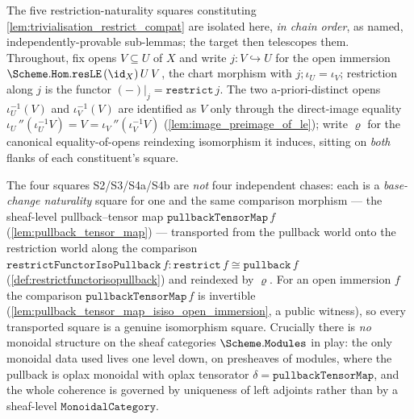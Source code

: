 The five restriction-naturality squares constituting \cref{lem:trivialisation_restrict_compat}
are isolated here, \emph{in chain order}, as named, independently-provable sub-lemmas; the target
then telescopes them. Throughout, fix opens \(V \subseteq U\) of \(X\) and write
\(j : V \hookrightarrow U\) for the open immersion \(\Scheme.\mathtt{Hom.resLE}\,(\id_X)\,U\,V\),
the chart morphism with \(j \mathbin{;} \iota_U = \iota_V\); restriction along \(j\) is the
functor \((-)|_j = \mathtt{restrict}\,j\). The two a-priori-distinct opens
\(\iota_U^{-1}(V)\) and \(\iota_V^{-1}(V)\) are identified as \(V\) only through the
direct-image equality \(\iota_U\,''(\iota_U^{-1}V) = V = \iota_V\,''(\iota_V^{-1}V)\)
(\cref{lem:image_preimage_of_le}); write \(\varrho\) for the canonical equality-of-opens
reindexing isomorphism it induces, sitting on \emph{both} flanks of each constituent's square.

The four squares S2/S3/S4a/S4b are \emph{not} four independent chases: each is a
\emph{base-change naturality} square for one and the same comparison morphism --- the
sheaf-level pullback--tensor map \(\mathtt{pullbackTensorMap}\,f\)
(\cref{lem:pullback_tensor_map}) --- transported from the pullback world onto the
restriction world along the comparison \(\mathtt{restrictFunctorIsoPullback}\,f :
\mathtt{restrict}\,f \cong \mathtt{pullback}\,f\) (\cref{def:restrictfunctorisopullback})
and reindexed by \(\varrho\). For an open immersion \(f\) the comparison
\(\mathtt{pullbackTensorMap}\,f\) is invertible
(\cref{lem:pullback_tensor_map_isiso_open_immersion}, a public witness), so every
transported square is a genuine isomorphism square. Crucially there is \emph{no} monoidal
structure on the sheaf categories \(\Scheme.\mathtt{Modules}\) in play: the only monoidal
data used lives one level down, on presheaves of modules, where the pullback is oplax
monoidal with oplax tensorator \(\delta = \mathtt{pullbackTensorMap}\), and the whole
coherence is governed by uniqueness of left adjoints rather than by a sheaf-level
\(\mathtt{MonoidalCategory}\).

